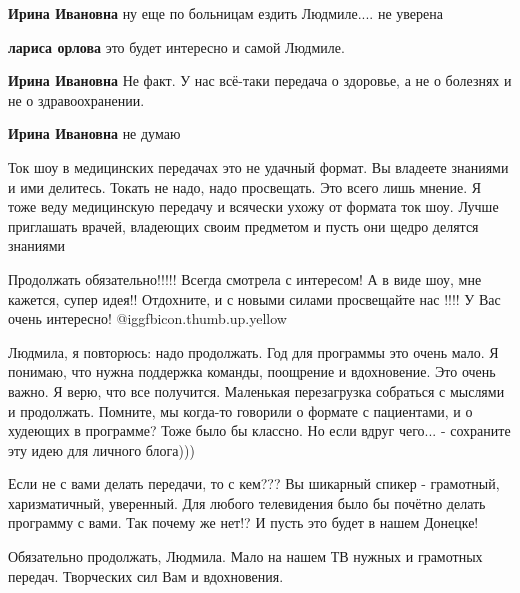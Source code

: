 \begin{itemize}
\begin{itemize} %
\textbf{Ирина Ивановна} ну еще по больницам ездить Людмиле.... не уверена

\textbf{лариса орлова} это будет интересно и самой Людмиле.


\textbf{Ирина Ивановна} Не факт. У нас всё-таки передача о здоровье, а не о болезнях и не о здравоохранении.

\textbf{Ирина Ивановна} не думаю
\end{itemize} %


Ток шоу в медицинских передачах это не удачный формат. Вы владеете знаниями и
ими делитесь. Токать не надо, надо просвещать. Это всего лишь мнение. Я тоже
веду медицинскую передачу и всячески ухожу от формата ток шоу. Лучше приглашать
врачей, владеющих своим предметом и пусть они щедро делятся знаниями


Продолжать обязательно!!!!! Всегда смотрела с интересом! А в виде шоу, мне
кажется, супер идея!! Отдохните, и с новыми силами просвещайте нас !!!! У Вас
очень интересно! @igg{fbicon.thumb.up.yellow} 


Людмила, я повторюсь: надо продолжать. Год для программы это очень мало. Я
понимаю, что нужна поддержка команды, поощрение и вдохновение. Это очень важно.
Я верю, что все получится. Маленькая перезагрузка собраться с мыслями и
продолжать. Помните, мы когда-то говорили о формате с пациентами, и о худеющих
в программе? Тоже было бы классно. Но если вдруг чего... - сохраните эту идею
для личного блога)))


Если не с вами делать передачи, то с кем??? Вы шикарный спикер - грамотный,
харизматичный, уверенный. Для любого телевидения было бы почётно делать
программу с вами. Так почему же нет!? И пусть это будет в нашем Донецке!


Обязательно продолжать, Людмила. Мало на нашем ТВ нужных и грамотных передач.
Творческих сил Вам и вдохновения.

\end{itemize} %

